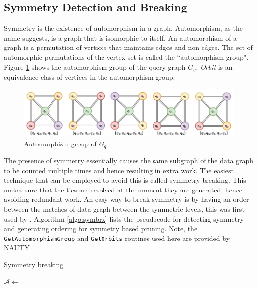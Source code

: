 \subsection{Symmetry Detection and Breaking}\label{sec:sym-detection}
Symmetry is the existence of automorphism in a graph. Automorphism, as the name suggests, is a graph that is isomorphic to itself.
An automorphism of a graph is a permutation of vertices that maintains edges and non-edges.
The set of automorphic permutations of the vertex set is called the ``automorphism group".
Figure \ref{fig:automorphism} shows the automorphism group of the query graph $G_q$.
\textit{Orbit} is an equivalence class of vertices in the automorphism group.
\begin{figure}
    \includegraphics[width=\textwidth]{fig/LR/automorphism.png}
    \caption{Automorphism group of $G_q$}
    \label{fig:automorphism}
\end{figure}

The presence of symmetry essentially causes the same subgraph of the data graph to be counted multiple times and hence resulting in extra work.
The easiest technique that can be employed to avoid this is called symmetry breaking. This makes sure that the ties are resolved at the moment they are generated, hence avoiding redundant work.
An easy way to break symmetry is by having an order between the matches of data graph between the symmetric levels, this was first
used by \cite{symbreak}. Algorithm \ref{algo:symbrk} lists the pseudocode for detecting symmetry and generating ordering for symmetry based pruning. Note, the \texttt{GetAutomorphismGroup} and \texttt{GetOrbits} routines used here are provided by NAUTY \cite{nauty}.

\begin{algorithm}
    \caption{Symmetry breaking}
    \label{algo:symbrk}
    $\mathcal{A} \leftarrow$ \;
\end{algorithm}


